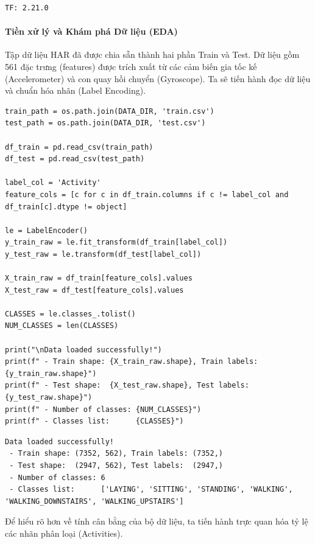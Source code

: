 \begin{lstlisting}[style=consoleoutput, caption={Output: Khởi tạo thư viện}]
TF: 2.21.0
\end{lstlisting}

\paragraph{Tiền xử lý và Khám phá Dữ liệu (EDA)} \hfill\mbox{}

Tập dữ liệu HAR đã được chia sẵn thành hai phần Train và Test. Dữ liệu gồm 561 đặc trưng (features) được trích xuất từ các cảm biến gia tốc kế (Accelerometer) và con quay hồi chuyển (Gyroscope). Ta sẽ tiến hành đọc dữ liệu và chuẩn hóa nhãn (Label Encoding).

\begin{lstlisting}[style=pythoncode, caption={Đọc dữ liệu và mã hóa nhãn (Label Encoding)}]
train_path = os.path.join(DATA_DIR, 'train.csv')
test_path = os.path.join(DATA_DIR, 'test.csv')

df_train = pd.read_csv(train_path)
df_test = pd.read_csv(test_path)

label_col = 'Activity'
feature_cols = [c for c in df_train.columns if c != label_col and df_train[c].dtype != object]

le = LabelEncoder()
y_train_raw = le.fit_transform(df_train[label_col])
y_test_raw = le.transform(df_test[label_col])

X_train_raw = df_train[feature_cols].values
X_test_raw = df_test[feature_cols].values

CLASSES = le.classes_.tolist()
NUM_CLASSES = len(CLASSES)

print("\nData loaded successfully!")
print(f" - Train shape: {X_train_raw.shape}, Train labels: {y_train_raw.shape}")
print(f" - Test shape:  {X_test_raw.shape}, Test labels:  {y_test_raw.shape}")
print(f" - Number of classes: {NUM_CLASSES}")
print(f" - Classes list:      {CLASSES}")
\end{lstlisting}

\begin{lstlisting}[style=consoleoutput, caption={Output: Thông tin tập dữ liệu}]
Data loaded successfully!
 - Train shape: (7352, 562), Train labels: (7352,)
 - Test shape:  (2947, 562), Test labels:  (2947,)
 - Number of classes: 6
 - Classes list:      ['LAYING', 'SITTING', 'STANDING', 'WALKING', 'WALKING_DOWNSTAIRS', 'WALKING_UPSTAIRS']
\end{lstlisting}

Để hiểu rõ hơn về tính cân bằng của bộ dữ liệu, ta tiến hành trực quan hóa tỷ lệ các nhãn phân loại (Activities).

